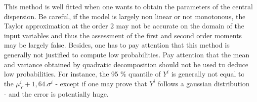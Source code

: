 {
  This method is well fitted when one wants to obtain the parameters of the central dispersion. Be careful, if the model is largely non linear or not monotonous, the Taylor approximation at the order 2 may not be accurate on the domain of the input variables and thus the assessment of the first and second order moments may be largely false. Besides, one has to pay attention that this method is generally not justified to compute low probabilities.
  Pay attention that the mean and variance obtained by quadratic decomposition should not be used tu deduce low probabilities. For instance, the 95 \% quantile of $Y^i$ is generally not equal to the $\mu_Y^i + 1,64 . \sigma^i$ - except if one may prove that $Y^i$ follows a gaussian distribution - and the error is potentially huge.
}
